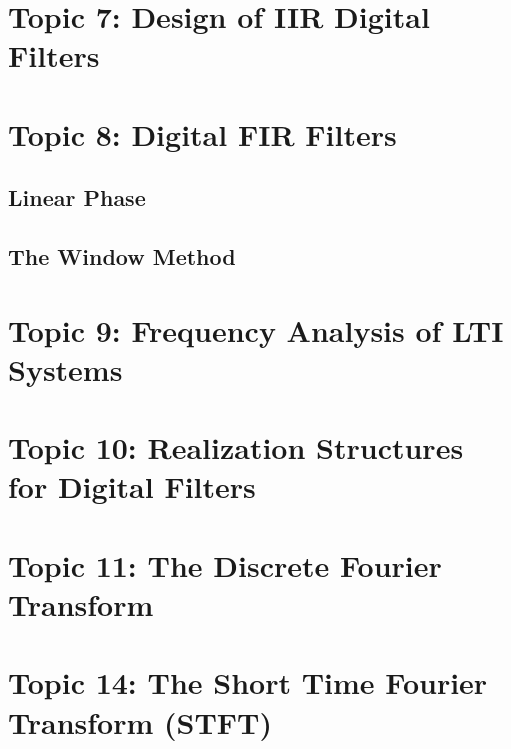 \documentclass{article}
\begin{document}
\section*{Topic 7: Design of IIR Digital Filters}
\section*{Topic 8: Digital FIR Filters}
\subsection*{Linear Phase}
\subsection*{The Window Method}
\section*{Topic 9: Frequency Analysis of LTI Systems}
\section*{Topic 10: Realization Structures for Digital Filters}
\section*{Topic 11: The Discrete Fourier Transform}
\section*{Topic 14: The Short Time Fourier Transform (STFT)}
\end{document}
